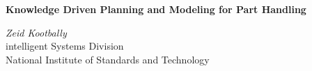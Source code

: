 \textbf{Knowledge Driven Planning and Modeling for Part Handling}\\

\vspace{1.5cm} %

\textit{Zeid Kootbally}\\
intelligent Systems Division\\
National Institute of Standards and Technology\\
                                                                                                                                                                                                                                                                                                                                                                                                                                                                                                                                                                                                                                                                                                                                                                                                                                                                                                                                                                                                                                                                                                                                                                        \\